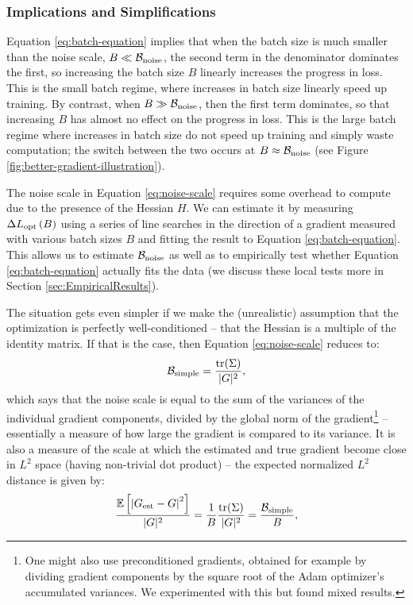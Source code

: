 \documentclass[english]{article}
\begin{document}
\subsubsection*{Implications and Simplifications}

Equation \ref{eq:batch-equation} implies that when the batch size is much smaller than the noise scale, $B\ll\mathcal{B}_{{\rm noise}}$, the second term in the denominator dominates the first, so increasing the batch size $B$ linearly increases the progress in loss. This is the small batch regime, where increases in batch size linearly speed up training. By contrast, when $B\gg\mathcal{B}_{{\rm noise}}$, then the first term dominates, so that increasing $B$ has almost no effect on the progress in loss. This is the large batch regime where increases in batch size do not speed up training and simply waste computation; the switch between the two occurs at $B\approx\mathcal{B}_{{\rm noise}}$ (see Figure \ref{fig:better-gradient-illustration}).

The noise scale in Equation \ref{eq:noise-scale} requires some overhead to compute due to the presence of the Hessian $H$. We can estimate it by measuring $\Delta L_{{\rm opt}}\left(B\right)$ using a series of line searches in the direction of a gradient measured with various batch sizes $B$ and fitting the result to Equation \ref{eq:batch-equation}. This allows us to estimate $\mathcal{B}_{{\rm noise}}$ as well as to empirically test whether Equation \ref{eq:batch-equation} actually fits the data (we discuss these local tests more in Section \ref{sec:EmpiricalResults}).

The situation gets even simpler if we make the (unrealistic) assumption that the optimization is perfectly well-conditioned -- that the Hessian is a multiple of the identity matrix. If that is the case, then Equation \ref{eq:noise-scale} reduces to:
\begin{equation}
\mathcal{B}_{{\rm simple}}=\frac{{\rm tr}(\Sigma)}{|G|^{2}},\label{eq:SimplestNoiseScale}
\end{equation}
which says that the noise scale is equal to the sum of the variances of the individual gradient components, divided by the global norm of the gradient\footnote{One might also use preconditioned gradients, obtained for example by dividing  gradient components by the square root of the Adam optimizer's \cite{kingma2014adam} accumulated variances.  We  experimented with this but found mixed results.} -- essentially a measure of how large the gradient is compared to its variance. It is also a measure of the scale at which the estimated and true gradient become close in $L^{2}$ space (having non-trivial dot product) -- the expected normalized $L^{2}$ distance is given by:
\begin{equation}
\frac{\mathbb{E}\left[\left|G_{{\rm est}}-G\right|^{2}\right]}{|G|^{2}}=\frac{1}{B}\frac{{\rm tr}(\Sigma)}{|G|^{2}}=\frac{\mathcal{B}_{{\rm simple}}}{B},
\end{equation}
\end{document}
